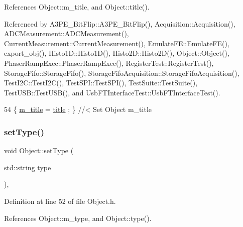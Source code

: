 References Object\+::m\+\_\+title, and Object\+::title().



Referenced by A3\+P\+E\+\_\+\+Bit\+Flip\+::\+A3\+P\+E\+\_\+\+Bit\+Flip(), Acquisition\+::\+Acquisition(), A\+D\+C\+Measurement\+::\+A\+D\+C\+Measurement(), Current\+Measurement\+::\+Current\+Measurement(), Emulate\+F\+E\+::\+Emulate\+F\+E(), export\+\_\+obj(), Histo1\+D\+::\+Histo1\+D(), Histo2\+D\+::\+Histo2\+D(), Object\+::\+Object(), Phaser\+Ramp\+Exec\+::\+Phaser\+Ramp\+Exec(), Register\+Test\+::\+Register\+Test(), Storage\+Fifo\+::\+Storage\+Fifo(), Storage\+Fifo\+Acquisition\+::\+Storage\+Fifo\+Acquisition(), Test\+I2\+C\+::\+Test\+I2\+C(), Test\+S\+P\+I\+::\+Test\+S\+P\+I(), Test\+Suite\+::\+Test\+Suite(), Test\+U\+S\+B\+::\+Test\+U\+S\+B(), and Usb\+F\+T\+Interface\+Test\+::\+Usb\+F\+T\+Interface\+Test().


\begin{DoxyCode}
54 \{ \hyperlink{classObject_affbeea1953eb5163573b92fad8f75727}{m\_title} = \hyperlink{classObject_a73a0f1a41828fdd8303dd662446fb6c3}{title} ; \} \textcolor{comment}{//< Set Object m\_title}
\end{DoxyCode}
\mbox{\label{classObject_aae534cc9d982bcb9b99fd505f2e103a5}} 
\subsubsection{\texorpdfstring{set\+Type()}{setType()}}
{\footnotesize\ttfamily void Object\+::set\+Type (\begin{DoxyParamCaption}\item[{std\+::string}]{type }\end{DoxyParamCaption})\hspace{0.3cm}{\ttfamily [inline]}, {\ttfamily [inherited]}}



Definition at line 52 of file Object.\+h.



References Object\+::m\+\_\+type, and Object\+::type().



